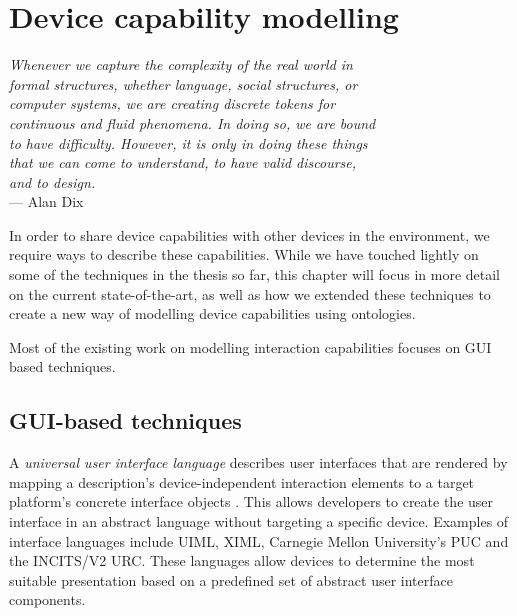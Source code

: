 \chapter{Device capability modelling}
\label{DeviceCapabilityModelling}

\begin{flushright}{\slshape    
Whenever we capture the complexity of the real world in \\
formal structures, whether language, social structures, or \\
computer systems, we are creating discrete tokens for \\
continuous and fluid phenomena. In doing so, we are bound \\
to have difficulty. However, it is only in doing these things\\
 that we can come to understand, to have valid discourse,\\
 and to design.} \\ \medskip
    ---  Alan Dix
\end{flushright}



In order to share device capabilities with other devices in the environment, we require ways to describe these capabilities. While we have touched lightly on some of the techniques in the thesis so far, this chapter will focus in more detail on the current state-of-the-art, as well as how we extended these techniques to create a new way of modelling device capabilities using ontologies.

Most of the existing work on modelling interaction capabilities focuses on \ac{GUI} based techniques. 

\section{GUI-based techniques}

A \emph{universal user interface language} describes user interfaces that are rendered by mapping a description's device-independent interaction elements to a target platform's concrete interface objects \cite{Lee2006}. This allows developers to create the user interface in an abstract language without targeting a specific device. Examples of interface languages include \ac{UIML}, \ac{XIML}, Carnegie Mellon University's  \ac{PUC} and the \ac{INCITS/V2 URC}. These languages allow devices to determine the most suitable presentation based on a predefined set of abstract user interface components.

